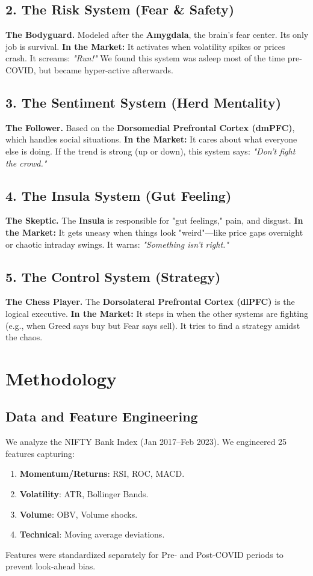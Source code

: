 \documentclass[12pt, oneside]{article}
\begin{document}
\subsection{2. The Risk System (Fear \& Safety)}
\textbf{The Bodyguard.} Modeled after the \textbf{Amygdala}, the brain's fear center. Its only job is survival.
\textbf{In the Market:} It activates when volatility spikes or prices crash. It screams: \textit{"Run!"} We found this system was asleep most of the time pre-COVID, but became hyper-active afterwards.

\subsection{3. The Sentiment System (Herd Mentality)}
\textbf{The Follower.} Based on the \textbf{Dorsomedial Prefrontal Cortex (dmPFC)}, which handles social situations.
\textbf{In the Market:} It cares about what everyone else is doing. If the trend is strong (up or down), this system says: \textit{"Don't fight the crowd."}

\subsection{4. The Insula System (Gut Feeling)}
\textbf{The Skeptic.} The \textbf{Insula} is responsible for "gut feelings," pain, and disgust.
\textbf{In the Market:} It gets uneasy when things look "weird"---like price gaps overnight or chaotic intraday swings. It warns: \textit{"Something isn't right."}

\subsection{5. The Control System (Strategy)}
\textbf{The Chess Player.} The \textbf{Dorsolateral Prefrontal Cortex (dlPFC)} is the logical executive.
\textbf{In the Market:} It steps in when the other systems are fighting (e.g., when Greed says buy but Fear says sell). It tries to find a strategy amidst the chaos.

\section{Methodology}

\subsection{Data and Feature Engineering}
We analyze the NIFTY Bank Index (Jan 2017--Feb 2023). We engineered 25 features capturing:
\begin{enumerate}
    \item \textbf{Momentum/Returns}: RSI, ROC, MACD.
    \item \textbf{Volatility}: ATR, Bollinger Bands.
    \item \textbf{Volume}: OBV, Volume shocks.
    \item \textbf{Technical}: Moving average deviations.
\end{enumerate}
Features were standardized separately for Pre- and Post-COVID periods to prevent look-ahead bias.
\end{document}
